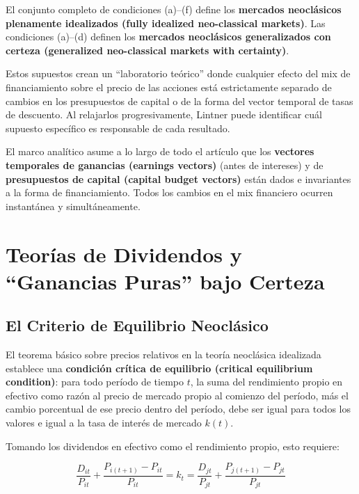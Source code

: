 \documentclass[12pt]{article}
\begin{document}
El conjunto completo de condiciones (a)--(f) define los \textbf{mercados neocl\'asicos plenamente idealizados (fully idealized neo-classical markets)}. Las condiciones (a)--(d) definen los \textbf{mercados neocl\'asicos generalizados con certeza (generalized neo-classical markets with certainty)}.

\begin{intuicion}
Estos supuestos crean un ``laboratorio te\'orico'' donde cualquier efecto del mix de financiamiento sobre el precio de las acciones est\'a estrictamente separado de cambios en los presupuestos de capital o de la forma del vector temporal de tasas de descuento. Al relajarlos progresivamente, Lintner puede identificar cu\'al supuesto espec\'ifico es responsable de cada resultado.
\end{intuicion}

El marco anal\'itico asume a lo largo de todo el art\'iculo que los \textbf{vectores temporales de ganancias (earnings vectors)} (antes de intereses) y de \textbf{presupuestos de capital (capital budget vectors)} est\'an dados e invariantes a la forma de financiamiento. Todos los cambios en el mix financiero ocurren instant\'anea y simult\'aneamente.

\section{Teor\'ias de Dividendos y ``Ganancias Puras'' bajo Certeza}

\subsection{El Criterio de Equilibrio Neocl\'asico}

El teorema b\'asico sobre precios relativos en la teor\'ia neocl\'asica idealizada establece una \textbf{condici\'on cr\'itica de equilibrio (critical equilibrium condition)}: para todo per\'iodo de tiempo $t$, la suma del rendimiento propio en efectivo como raz\'on al precio de mercado propio al comienzo del per\'iodo, m\'as el cambio porcentual de ese precio dentro del per\'iodo, debe ser igual para todos los valores e igual a la tasa de inter\'es de mercado $k(t)$.

Tomando los dividendos en efectivo como el rendimiento propio, esto requiere:

\begin{equation}
\frac{D_{it}}{P_{it}} + \frac{P_{i(t+1)} - P_{it}}{P_{it}} = k_t = \frac{D_{jt}}{P_{jt}} + \frac{P_{j(t+1)} - P_{jt}}{P_{jt}}
\end{equation}
\end{document}
